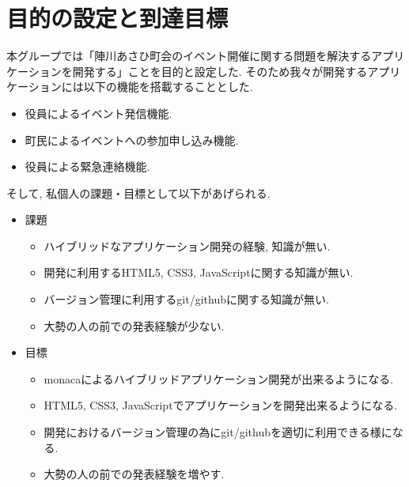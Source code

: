 \section{目的の設定と到達目標}
本グループでは「陣川あさひ町会のイベント開催に関する問題を解決するアプリケーションを開発する」ことを目的と設定した.
そのため我々が開発するアプリケーションには以下の機能を搭載することとした.
\begin{itemize}
    \item 役員によるイベント発信機能.
    \item 町民によるイベントへの参加申し込み機能.
    \item 役員による緊急連絡機能.
\end{itemize}
そして, 私個人の課題・目標として以下があげられる.
\begin{itemize}
    \item 課題
    \begin{itemize}
        \item ハイブリッドなアプリケーション開発の経験, 知識が無い.
        \item 開発に利用するHTML5, CSS3, JavaScriptに関する知識が無い.
        \item バージョン管理に利用するgit/githubに関する知識が無い.
        \item 大勢の人の前での発表経験が少ない.
    \end{itemize}

    \item 目標
    \begin{itemize}
        \item monacaによるハイブリッドアプリケーション開発が出来るようになる.
        \item HTML5, CSS3, JavaScriptでアプリケーションを開発出来るようになる.
        \item 開発におけるバージョン管理の為にgit/githubを適切に利用できる様になる.
        \item 大勢の人の前での発表経験を増やす.
    \end{itemize}
\end{itemize}

